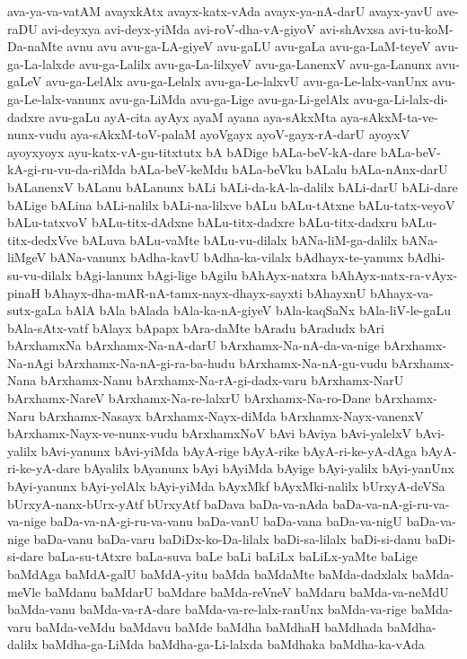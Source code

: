 {ava-ya-va-vatAM
avayxkAtx
avayx-katx-vAda
avayx-ya-nA-darU
avayx-yavU
ave-raDU
avi-deyxya
avi-deyx-yiMda
avi-roV-dha-vA-giyoV
avi-shAvxsa
avi-tu-koM-Da-naMte
avnu
avu
avu-ga-LA-giyeV
avu-gaLU
avu-gaLa
avu-ga-LaM-teyeV
avu-ga-La-lalxde
avu-ga-Lalilx
avu-ga-La-lilxyeV
avu-ga-LanenxV
avu-ga-Lanunx
avu-gaLeV
avu-ga-LelAlx
avu-ga-Lelalx
avu-ga-Le-lalxvU
avu-ga-Le-lalx-vanUnx
avu-ga-Le-lalx-vanunx
avu-ga-LiMda
avu-ga-Lige
avu-ga-Li-gelAlx
avu-ga-Li-lalx-di-dadxre
avu-gaLu
ayA-cita
ayAyx
ayaM
ayana
aya-sAkxMta
aya-sAkxM-ta-ve-nunx-vudu
aya-sAkxM-toV-palaM
ayoVgayx
ayoV-gayx-rA-darU
ayoyxV
ayoyxyoyx
ayu-katx-vA-gu-titxtutx
bA
bADige
bALa-beV-kA-dare
bALa-beV-kA-gi-ru-vu-da-riMda
bALa-beV-keMdu
bALa-beVku
bALalu
bALa-nAnx-darU
bALanenxV
bALanu
bALanunx
bALi
bALi-da-kA-la-dalilx
bALi-darU
bALi-dare
bALige
bALina
bALi-nalilx
bALi-na-lilxve
bALu
bALu-tAtxne
bALu-tatx-veyoV
bALu-tatxvoV
bALu-titx-dAdxne
bALu-titx-dadxre
bALu-titx-dadxru
bALu-titx-dedxVve
bALuva
bALu-vaMte
bALu-vu-dilalx
bANa-liM-ga-dalilx
bANa-liMgeV
bANa-vanunx
bAdha-kavU
bAdha-ka-vilalx
bAdhayx-te-yanunx
bAdhi-su-vu-dilalx
bAgi-lanunx
bAgi-lige
bAgilu
bAhAyx-natxra
bAhAyx-natx-ra-vAyx-pinaH
bAhayx-dha-mAR-nA-tamx-nayx-dhayx-sayxti
bAhayxnU
bAhayx-va-sutx-gaLa
bAlA
bAla
bAlada
bAla-ka-nA-giyeV
bAla-kaqSaNx
bAla-liV-le-gaLu
bAla-sAtx-vatf
bAlayx
bApapx
bAra-daMte
bAradu
bAradudx
bAri
bArxhamxNa
bArxhamx-Na-nA-darU
bArxhamx-Na-nA-da-va-nige
bArxhamx-Na-nAgi
bArxhamx-Na-nA-gi-ra-ba-hudu
bArxhamx-Na-nA-gu-vudu
bArxhamx-Nana
bArxhamx-Nanu
bArxhamx-Na-rA-gi-dadx-varu
bArxhamx-NarU
bArxhamx-NareV
bArxhamx-Na-re-lalxrU
bArxhamx-Na-ro-Dane
bArxhamx-Naru
bArxhamx-Nasayx
bArxhamx-Nayx-diMda
bArxhamx-Nayx-vanenxV
bArxhamx-Nayx-ve-nunx-vudu
bArxhamxNoV
bAvi
bAviya
bAvi-yalelxV
bAvi-yalilx
bAvi-yanunx
bAvi-yiMda
bAyA-rige
bAyA-rike
bAyA-ri-ke-yA-dAga
bAyA-ri-ke-yA-dare
bAyalilx
bAyanunx
bAyi
bAyiMda
bAyige
bAyi-yalilx
bAyi-yanUnx
bAyi-yanunx
bAyi-yelAlx
bAyi-yiMda
bAyxMkf
bAyxMki-nalilx
bUrxyA-deVSa
bUrxyA-nanx-bUrx-yAtf
bUrxyAtf
baDava
baDa-va-nAda
baDa-va-nA-gi-ru-va-va-nige
baDa-va-nA-gi-ru-va-vanu
baDa-vanU
baDa-vana
baDa-va-nigU
baDa-va-nige
baDa-vanu
baDa-varu
baDiDx-ko-Da-lilalx
baDi-sa-lilalx
baDi-si-danu
baDi-si-dare
baLa-su-tAtxre
baLa-suva
baLe
baLi
baLiLx
baLiLx-yaMte
baLige
baMdAga
baMdA-galU
baMdA-yitu
baMda
baMdaMte
baMda-dadxlalx
baMda-meVle
baMdanu
baMdarU
baMdare
baMda-reVneV
baMdaru
baMda-va-neMdU
baMda-vanu
baMda-va-rA-dare
baMda-va-re-lalx-ranUnx
baMda-va-rige
baMda-varu
baMda-veMdu
baMdavu
baMde
baMdha
baMdhaH
baMdhada
baMdha-dalilx
baMdha-ga-LiMda
baMdha-ga-Li-lalxda
baMdhaka
baMdha-ka-vAda
}
